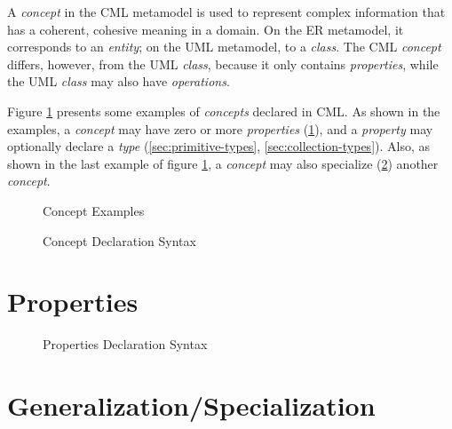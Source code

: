 A \emph{concept} in the CML metamodel is used
to represent complex information
that has a coherent, cohesive meaning in a domain.
On the ER \cite{er} metamodel,
it corresponds to an \emph{entity};
on the UML \cite{uml} metamodel,
to a \emph{class}.
The CML \emph{concept} differs, however, from the UML \emph{class},
because it only contains \emph{properties},
while the UML \emph{class} may also have \emph{operations}.

Figure \ref{fig:ex:concepts} presents some examples of \emph{concepts} declared in CML.
As shown in the examples,
a \emph{concept} may have zero or more \emph{properties}
(\ref{sec:properties}),
and a \emph{property} may optionally declare a \emph{type}
(\ref{sec:primitive-types}, \ref{sec:collection-types}).
Also, as shown in the last example of figure \ref{fig:ex:concepts},
a \emph{concept} may also specialize
(\ref{sec:generalization})
another \emph{concept}.

\begin{figure}
\verbatimfont{\small}
\begin{framed}

\end{framed}
\caption{Concept Examples}
\label{fig:ex:concepts}
\end{figure}


\begin{figure}
\verbatimfont{\small}
\begin{framed}

\end{framed}
\caption{Concept Declaration Syntax}
\label{fig:concept-syntax}
\end{figure}

\section{Properties}\label{sec:properties}

\begin{figure}
\verbatimfont{\small}
\begin{framed}

\end{framed}
\caption{Properties Declaration Syntax}
\label{fig:properties-syntax}
\end{figure}

\section{Generalization/Specialization}\label{sec:generalization}
